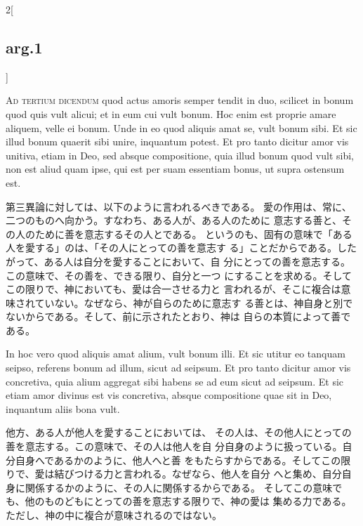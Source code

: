 \documentclass[paper=a4paper,fontsize=10pt,jafontsize=9pt,titlepage]{jlreq}
\begin{document}
\begin{paracol}{2}[\subsection{arg.1}]
\switchcolumn*[\subsection{ad.3}]


{\scshape Ad tertium dicendum} quod actus amoris semper
tendit in duo, scilicet in bonum quod quis vult alicui; et in eum cui
vult bonum. Hoc enim est proprie amare aliquem, velle ei bonum. Unde in
eo quod aliquis amat se, vult bonum sibi. Et sic illud bonum quaerit
sibi unire, inquantum potest. Et pro tanto dicitur amor vis unitiva,
etiam in Deo, sed absque compositione, quia illud bonum quod vult sibi,
non est aliud quam ipse, qui est per suam essentiam bonus, ut supra
ostensum est.

\switchcolumn

第三異論に対しては、以下のように言われるべきである。
愛の作用は、常に、二つのものへ向かう。すなわち、ある人が、ある人のために
 意志する善と、その人のために善を意志するその人とである。
というのも、固有の意味で「ある人を愛する」のは、「その人にとっての善を意志す
 る」ことだからである。したがって、ある人は自分を愛することにおいて、自
 分にとっての善を意志する。この意味で、その善を、できる限り、自分と一つ
 にすることを求める。そしてこの限りで、神においても、愛は合一させる力と
 言われるが、そこに複合は意味されていない。なぜなら、神が自らのために意志す
 る善とは、神自身と別でないからである。そして、前に示されたとおり、神は
 自らの本質によって善である。

\switchcolumn*


In hoc vero quod aliquis amat alium, vult bonum illi. Et
sic utitur eo tanquam seipso, referens bonum ad illum, sicut ad
seipsum. Et pro tanto dicitur amor vis concretiva, quia alium aggregat
sibi habens se ad eum sicut ad seipsum. Et sic etiam amor divinus est
vis concretiva, absque compositione quae sit in Deo, inquantum aliis
bona vult.

\switchcolumn

他方、ある人が他人を愛することにおいては、
 その人は、その他人にとっての善を意志する。この意味で、その人は他人を自
 分自身のように扱っている。自分自身へであるかのように、他人へと善
 をもたらすからである。そしてこの限りで、愛は結びつける力と言われる。なぜなら、他人を自分
 へと集め、自分自身に関係するかのように、その人に関係するからである。
 そしてこの意味でも、他のものどもにとっての善を意志する限りで、神の愛は
 集める力である。ただし、神の中に複合が意味されるのではない。

\end{paracol}
\newpage
\end{document}
